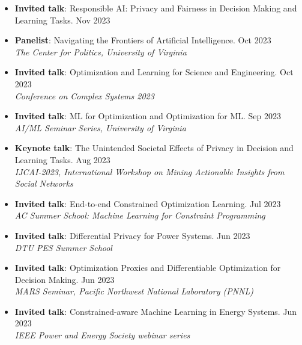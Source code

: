 \begin{itemize}
  \item {\bf Invited talk}: {Responsible AI: Privacy and Fairness in Decision Making and Learning Tasks.} \hfill{Nov 2023}\\
  {}

  \item {\bf Panelist}: {Navigating the Frontiers of Artificial Intelligence.} \hfill{Oct 2023}\\
  {\em  The Center for Politics, University of Virginia}

  \item {\bf Invited talk}: {Optimization and Learning for Science and Engineering.} \hfill{Oct 2023}\\
  {\em  Conference on Complex Systems 2023}

  \item {\bf Invited talk}: {ML for Optimization and Optimization for ML.} \hfill{Sep 2023}\\
  {\em  AI/ML Seminar Series, University of Virginia}

  \item {\bf Keynote talk}: {The Unintended Societal Effects of Privacy in Decision and Learning Tasks.} \hfill{Aug 2023}\\
  {\em  IJCAI-2023, International Workshop on Mining Actionable Insights from Social Networks}

  \item {\bf Invited talk}: {End-to-end Constrained Optimization Learning.} \hfill{Jul 2023}\\
  {\em  AC Summer School: Machine Learning for Constraint Programming}

  \item {\bf Invited talk}: {Differential Privacy for Power Systems.} \hfill{Jun 2023}\\
  {\em  DTU PES Summer School}

  \item {\bf Invited talk}: {Optimization Proxies and Differentiable Optimization for Decision Making.} \hfill{Jun 2023}\\
  {\em  MARS Seminar, Pacific Northwest National Laboratory (PNNL)}

  \item {\bf Invited talk}: {Constrained-aware Machine Learning in Energy Systems.} \hfill{Jun 2023}\\
  {\em  IEEE Power and Energy Society webinar series}


\end{itemize}
